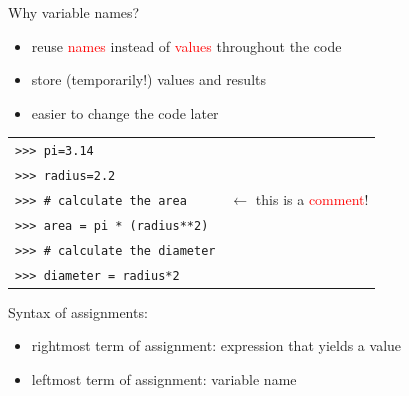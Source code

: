 \documentclass[t,handout,9pt]{beamer}
\begin{document}
\begin{frame}
\vfill
Why variable names?
\begin{itemize}
	\item reuse \textcolor{red}{names} instead of \textcolor{red}{values} throughout the code
	\item store (temporarily!) values and results
	\item easier to change the code later
\end{itemize}
\begin{table}[]
\begin{tabular}{ll}
\texttt{>{}>{}> pi=3.14} &  \\
\texttt{>{}>{}> radius=2.2}        & \\
\texttt{>{}>{}> \# calculate the area}        & $\leftarrow$ this is a \textcolor{red}{comment}! \\
\texttt{>{}>{}> area = pi * (radius**2)}        &  \\
\texttt{>{}>{}> \# calculate the diameter}        & \\
\texttt{>{}>{}> diameter = radius*2}        &  \\
\end{tabular}
\end{table}
Syntax of assignments:
\begin{itemize}
	\item rightmost term of assignment: expression that yields a value
	\item leftmost term of assignment: variable name
\end{itemize}
\vfill
\end{frame}
%
\end{document}
